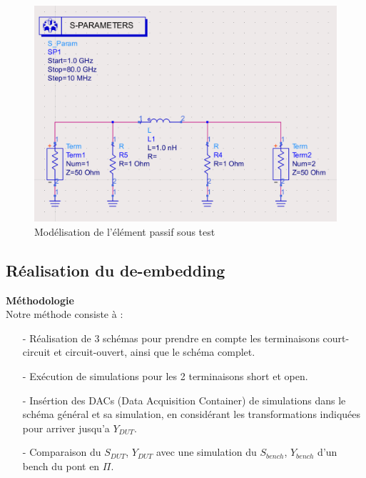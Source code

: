 \documentclass[a4paper]{article}
\begin{document}
\begin{figure}[!htb]
\begin{center}
  \includegraphics[scale=0.23]{de-embedding_bench.png}
  \caption{Mod\'elisation de l'\'el\'ement passif sous test}
  \label{de-embedding-bench}
\end{center}
\end{figure}

\subsection{R\'ealisation du de-embedding}
\textbf{M\'ethodologie}\\
Notre m\'ethode consiste \`a :
\begin{itemize}
  \item [-] R\'ealisation de 3 sch\'emas pour prendre en compte les terminaisons court-circuit et circuit-ouvert, ainsi que le sch\'ema
  complet.
  \item[-] Ex\'ecution de simulations pour les 2 terminaisons short et open.
  \item[-] Ins\'ertion des DACs (Data Acquisition Container) de simulations dans le sch\'ema g\'en\'eral et sa simulation,
   en consid\'erant les transformations indiqu\'ees pour arriver jusqu'a $Y_{DUT}$.
  \item[-] Comparaison du $S_{DUT}$, $Y_{DUT}$ avec une simulation du $S_{bench}$, $Y_{bench}$ d'un bench du pont en $\Pi$.
\end{itemize}
\end{document}
